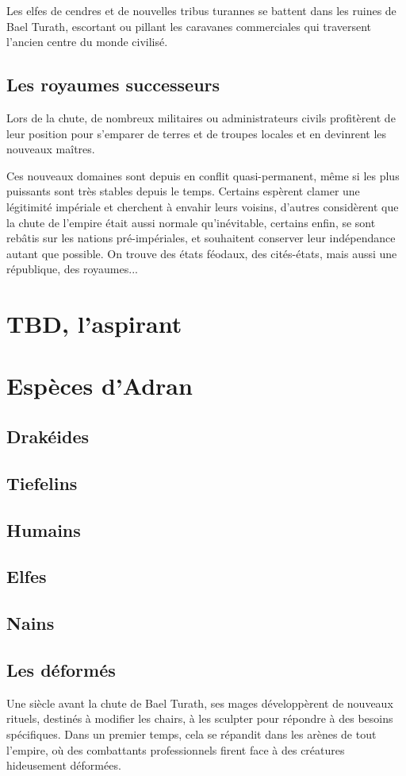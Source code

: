 \documentclass[10pt,a4paper]{book}
\begin{document}
Les elfes de cendres et de nouvelles tribus turannes se battent dans les ruines de Bael Turath, escortant ou pillant les caravanes commerciales qui traversent l'ancien centre du monde civilisé.
\section{Les royaumes successeurs}
Lors de la chute, de nombreux militaires ou administrateurs civils profitèrent de leur position pour s'emparer de terres et de troupes locales et en devinrent les nouveaux maîtres. 

Ces nouveaux domaines sont depuis en conflit quasi-permanent, même si les plus puissants sont très stables depuis le temps. Certains espèrent clamer une légitimité impériale et cherchent à envahir leurs voisins, d'autres considèrent que la chute de l'empire était aussi normale qu'inévitable, certains enfin, se sont rebâtis sur les nations pré-impériales, et souhaitent conserver leur indépendance autant que possible. On trouve des états féodaux, des cités-états, mais aussi une république, des royaumes...
\chapter{TBD, l'aspirant}
\chapter{Espèces d'Adran}
\section{Drakéides}
\section{Tiefelins}
\section{Humains}
\section{Elfes}
\section{Nains}
\section{Les déformés}
Une siècle avant la chute de Bael Turath, ses mages développèrent de nouveaux rituels, destinés à modifier les chairs, à les sculpter pour répondre à des besoins spécifiques. Dans un premier temps, cela se répandit dans les arènes de tout l'empire, où des combattants professionnels firent face à des créatures hideusement déformées. 
\end{document}
